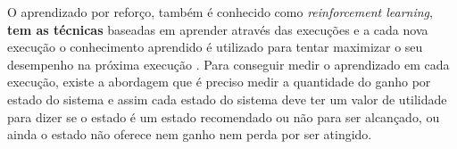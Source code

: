 O aprendizado por reforço, também é conhecido como \textit{reinforcement learning}, \textbf{tem as técnicas } baseadas em  aprender através das execuções e a cada nova execução o conhecimento aprendido é utilizado para tentar maximizar o seu desempenho na próxima execução \cite{intelligence2003modern}. Para conseguir medir o aprendizado em cada execução, existe a abordagem que é preciso medir a quantidade do ganho por estado do sistema e assim cada estado do sistema deve ter um valor de utilidade para dizer se o estado é um estado recomendado ou não para ser alcançado, ou ainda o estado não oferece nem ganho nem perda por ser atingido. 



